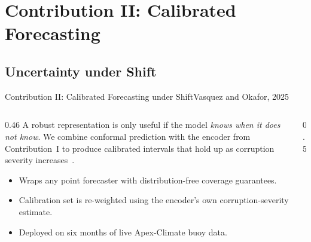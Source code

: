 \section{Contribution II: Calibrated Forecasting}
\subsection{Uncertainty under Shift}

\begin{frame}{Contribution II: Calibrated Forecasting under Shift}{Vasquez and Okafor, 2025}
  \small
  \begin{columns}[T]
    \begin{column}{0.46\textwidth}
      A robust representation is only useful if the model \emph{knows when it
      does not know}. We combine conformal prediction with the encoder from
      Contribution~I to produce calibrated intervals that hold up as
      corruption severity increases~\cite{vasquez2025uncertainty,diaz2025conformal}.

      \vspace{0.15cm}
      \begin{itemize}
        \item Wraps any point forecaster with distribution-free coverage
          guarantees.
        \item Calibration set is re-weighted using the encoder's own
          corruption-severity estimate.
        \item Deployed on six months of live Apex-Climate buoy data.
      \end{itemize}
    \end{column}
    \begin{column}{0.5\textwidth}
      \centering
\end{column}
\end{columns}
\end{frame}
